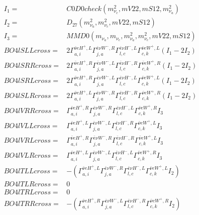 \documentclass[A4,landscape]{article}
\begin{document}
\begin{align} 
I_1 = & C0D0check(m^2_{\nu_{{c}}}, mV22, mS12, m^2_{\nu_{{a}}}) \\ 
I_2 = & D_{27}(m^2_{\nu_{{a}}}, m^2_{\nu_{{c}}}, mV22, mS12) \\ 
I_3 = & MMD0(m_{\nu_{{a}}}, m_{\nu_{{c}}}, m^2_{\nu_{{a}}}, m^2_{\nu_{{c}}}, mV22, mS12) \\ 
  BO4lSLLcross= & 2  \Gamma^{\bar{\nu}e H^+ ,L}_{a, i} \Gamma^{\bar{e}\nu W^-,R}_{j, a} \Gamma^{\bar{e}\nu H^-,L}_{l, c} \Gamma^{\bar{\nu}e W^+ ,L}_{c, k} (I_1 - 2 I_2) \\ 
  BO4lSRRcross= & 2  \Gamma^{\bar{\nu}e H^+ ,R}_{a, i} \Gamma^{\bar{e}\nu W^-,L}_{j, a} \Gamma^{\bar{e}\nu H^-,R}_{l, c} \Gamma^{\bar{\nu}e W^+ ,R}_{c, k} (I_1 - 2 I_2) \\ 
  BO4lSRLcross= & 2  \Gamma^{\bar{\nu}e H^+ ,R}_{a, i} \Gamma^{\bar{e}\nu W^-,L}_{j, a} \Gamma^{\bar{e}\nu H^-,L}_{l, c} \Gamma^{\bar{\nu}e W^+ ,L}_{c, k} (I_1 - 2 I_2) \\ 
  BO4lSLRcross= & 2  \Gamma^{\bar{\nu}e H^+ ,L}_{a, i} \Gamma^{\bar{e}\nu W^-,R}_{j, a} \Gamma^{\bar{e}\nu H^-,R}_{l, c} \Gamma^{\bar{\nu}e W^+ ,R}_{c, k} (I_1 - 2 I_2) \\ 
  BO4lVRRcross= &  \Gamma^{\bar{\nu}e H^+ ,R}_{a, i} \Gamma^{\bar{e}\nu W^-,R}_{j, a} \Gamma^{\bar{e}\nu H^-,L}_{l, c} \Gamma^{\bar{\nu}e W^+ ,R}_{c, k} I_3 \\ 
  BO4lVLLcross= &  \Gamma^{\bar{\nu}e H^+ ,L}_{a, i} \Gamma^{\bar{e}\nu W^-,L}_{j, a} \Gamma^{\bar{e}\nu H^-,R}_{l, c} \Gamma^{\bar{\nu}e W^+ ,L}_{c, k} I_3 \\ 
  BO4lVRLcross= &  \Gamma^{\bar{\nu}e H^+ ,R}_{a, i} \Gamma^{\bar{e}\nu W^-,R}_{j, a} \Gamma^{\bar{e}\nu H^-,R}_{l, c} \Gamma^{\bar{\nu}e W^+ ,L}_{c, k} I_3 \\ 
  BO4lVLRcross= &  \Gamma^{\bar{\nu}e H^+ ,L}_{a, i} \Gamma^{\bar{e}\nu W^-,L}_{j, a} \Gamma^{\bar{e}\nu H^-,L}_{l, c} \Gamma^{\bar{\nu}e W^+ ,R}_{c, k} I_3 \\ 
  BO4lTLLcross= & -( \Gamma^{\bar{\nu}e H^+ ,L}_{a, i} \Gamma^{\bar{e}\nu W^-,R}_{j, a} \Gamma^{\bar{e}\nu H^-,L}_{l, c} \Gamma^{\bar{\nu}e W^+ ,L}_{c, k} I_2) \\ 
  BO4lTLRcross= & 0 \\ 
  BO4lTRLcross= & 0 \\ 
  BO4lTRRcross= & -( \Gamma^{\bar{\nu}e H^+ ,R}_{a, i} \Gamma^{\bar{e}\nu W^-,L}_{j, a} \Gamma^{\bar{e}\nu H^-,R}_{l, c} \Gamma^{\bar{\nu}e W^+ ,R}_{c, k} I_2) \\ 
\end{align} 
\end{document}
